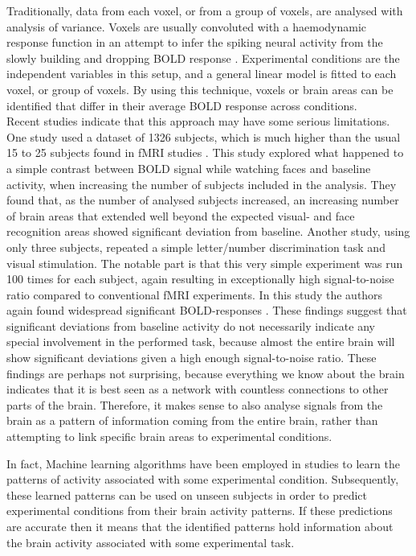 \documentclass[preprint,journal,11pt]{vgtc}
\begin{document}
Traditionally, data from each voxel, or from a group of voxels, are analysed with analysis of variance. Voxels are usually convoluted with a haemodynamic response function in an attempt to infer the spiking neural activity from the slowly building and dropping BOLD response \cite{he:2002na}. Experimental conditions are the independent variables in this setup, and a general linear model is fitted to each voxel, or group of voxels. By using this technique, voxels or brain areas can be identified that differ in their average BOLD response across conditions.\\
\indent Recent studies indicate that this approach may have some serious limitations. One study used a dataset of 1326 subjects, which is much higher than the usual 15 to 25 subjects found in fMRI studies \cite{thy:2012very}. This study explored what happened to a simple contrast between BOLD signal while watching faces and baseline activity, when increasing the number of subjects included in the analysis. They found that, as the number of analysed subjects increased, an increasing number of brain areas that extended well beyond the expected visual- and face recognition areas showed significant deviation from baseline. Another study, using only three subjects, repeated a simple letter/number discrimination task and visual stimulation. The notable part is that this very simple experiment was run 100 times for each subject, again resulting in exceptionally high signal-to-noise ratio compared to conventional fMRI experiments. In this study the authors again found widespread significant BOLD-responses \cite{go:2012whole}. These findings suggest that significant deviations from baseline activity do not necessarily indicate any special involvement in the performed task, because almost the entire brain will show significant deviations given a high enough signal-to-noise ratio. These findings are perhaps not surprising, because everything we know about the brain indicates that it is best seen as a network with countless connections to other parts of the brain. Therefore, it makes sense to also analyse signals from the brain as a pattern of information coming from the entire brain, rather than attempting to link specific brain areas to experimental conditions.

In fact, Machine learning algorithms have been employed in studies to learn the patterns of activity associated with some experimental condition. Subsequently, these learned patterns can be used on unseen subjects in order to predict experimental conditions from their brain activity patterns. If these predictions are accurate then it means that the identified patterns hold information about the brain activity associated with some experimental task.\\
\end{document}
